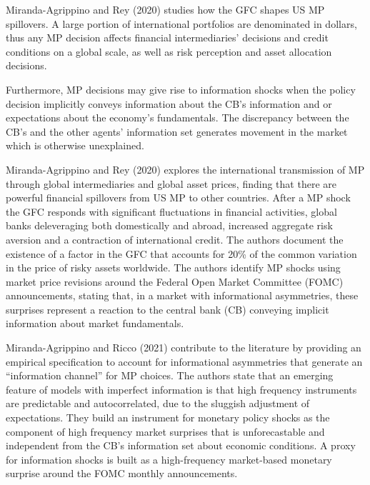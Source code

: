 \documentclass[10pt,a4paper,draft]{article}
\begin{document}
Miranda-Agrippino and Rey (2020) studies how the GFC shapes US MP spillovers. A large portion of international portfolios are denominated in dollars, thus any MP decision affects financial intermediaries' decisions and credit conditions on a global scale, as well as risk perception and asset allocation decisions. 

Furthermore, MP decisions may give rise to information shocks when the policy decision implicitly conveys information about the CB's information and or expectations about the economy's fundamentals. The discrepancy between the CB's and the other agents' information set generates movement in the market which is otherwise unexplained.


Miranda-Agrippino and Rey (2020) explores the international transmission of MP through global intermediaries and global asset prices, finding that there are powerful financial spillovers from US MP to other countries. After a MP shock the GFC responds with significant fluctuations in financial activities, global banks deleveraging both domestically and abroad, increased aggregate risk aversion and a contraction of international credit. The authors document the existence of a factor in the GFC that accounts for 20\% of the common variation in the price of risky assets worldwide.
The authors identify MP shocks using market price revisions around the Federal Open Market Committee (FOMC) announcements, stating that, in a market with informational asymmetries, these surprises represent a reaction to the central bank (CB) conveying implicit information about market fundamentals.



Miranda-Agrippino and Ricco (2021) contribute to the literature by providing an empirical specification to account for informational asymmetries that generate an \enquote{information channel} for MP choices. The authors state that an emerging feature of models with imperfect information is that high frequency instruments are predictable and autocorrelated, due to the sluggish adjustment of expectations. 
They build an instrument for monetary policy shocks as the component of high frequency market surprises that is unforecastable and independent from the CB's information set about economic conditions. %
A proxy for information shocks is built as a high-frequency market-based monetary surprise around the FOMC monthly announcements. %
\end{document}
